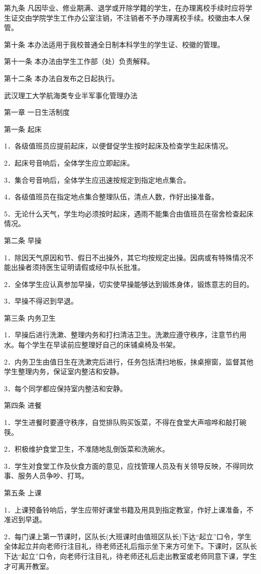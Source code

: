 \documentclass[UTF8,12pt,a4paper]{report}
\begin{document}
第九条 凡因毕业、修业期满、退学或开除学籍的学生，在办理离校手续时应将学生证交由学院学生工作办公室注销，不注销者不予办理离校手续。校徽由本人保管。

第十条 本办法适用于我校普通全日制本科学生的学生证、校徽的管理。

第十一条 本办法由学生工作部（处）负责解释。

第十二条 本办法自发布之日起执行。



武汉理工大学航海类专业半军事化管理办法

第一章 一日生活制度

第一条 起床

1．各级值班员应提前起床，以便督促学生按时起床及检查学生起床情况。

2．起床号音响后，全体学生应立即起床。

3．集合号音响后，全体学生应迅速按规定到指定地点集合。

4．各级值班员在指定地点集合整理队伍，清点人数，作好出操准备。

5．无论什么天气，学生均必须按时起床，遇雨不能集合由值班员在宿舍检查起床情况。

第二条 早操

1．除因天气原因和节、假日不出操外，其它均按规定出操。因病或有特殊情况不能出操者须持医生证明请假或经中队长批准。

2．全体学生应认真参加早操，切实使早操能够达到锻炼身体，锻炼意志的目的。

3．早操不得迟到早退。

第三条 内务卫生

1．早操后进行洗漱、整理内务和打扫清洁卫生。洗漱应遵守秩序，注意节约用水。每个学生在早读前应整理好自己的床铺桌椅及书架。

2．内务卫生由值日生在洗漱完后进行，任务包括清扫地板，抹桌擦窗，监督其他学生整理内务，保证室内整洁和安静。

3．每个同学都应保持室内整洁和安静。

第四条 进餐

1．学生进餐时要遵守秩序，自觉排队购买饭菜，不得在食堂大声喧哗和敲打碗筷。

2．积极维护食堂卫生，不准随地乱倒饭菜和洗碗水。

3．学生对食堂工作及伙食方面的意见，应找管理人员及有关领导反映，不得同炊事、服务人员争吵、打骂。

第五条 上课

1．上课预备铃响后，学生应带好课堂书籍及用具到指定教室，作好上课准备，不准迟到早退。

2．每门课上第一节课时，区队长(大班课时由值班区队长)下达“起立”口令，学生全体起立并向老师行注目礼，待老师还礼后指示坐下来方可坐下。下课时，区队长下达“起立”口令，向老师行注目礼，待老师还礼后走出教室或老师同意下课，学生才可离开教室。
\end{document}
